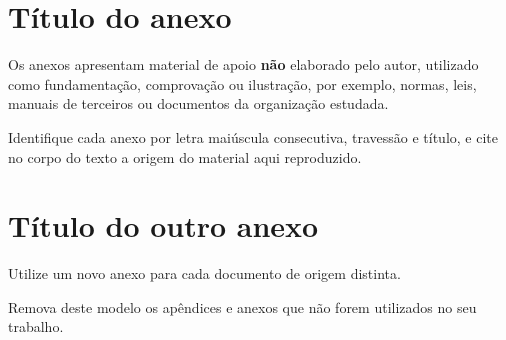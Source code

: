 \documentclass[tcc,capa]{texifsap}
\begin{document}
\anexos
\chapter{Título do anexo}

Os anexos apresentam material de apoio \textbf{não} elaborado pelo
autor, utilizado como fundamentação, comprovação ou ilustração, por
exemplo, normas, leis, manuais de terceiros ou documentos da organização
estudada.

Identifique cada anexo por letra maiúscula consecutiva, travessão e
título, e cite no corpo do texto a origem do material aqui reproduzido.

\chapter{Título do outro anexo}

Utilize um novo anexo para cada documento de origem distinta.

Remova deste modelo os apêndices e anexos que não forem utilizados no
seu trabalho.
\end{document}
